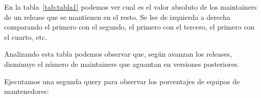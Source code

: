 \documentclass[a4paper, 12pt]{book}
\begin{document}
	


	
	
	
	



	
	En la tabla~\ref{tab:tabla1} podemos ver cual es el valor absoluto de los maintainers de un release que se mantienen en el resto. Se lee de izquierda a derecha comparando el primero con el segundo, el primero con el tercero, el primero con el cuarto, etc.
	
	Analizando esta tabla podemos observar que, según avanzan los releases, disminuye el número de maintainers que aguantan en versiones posteriores.
	
	Ejecutamos una segunda query para observar los porcentajes de equipos de mantenedores:
	
\end{document}
